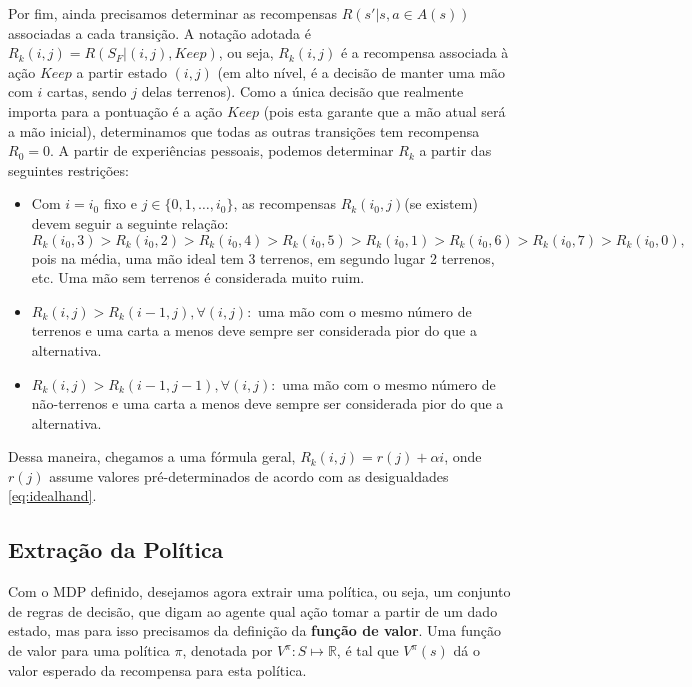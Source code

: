 Por fim, ainda precisamos determinar as recompensas $R\left(s' | s, a \in A(s) \right)$ associadas a cada
transição. A notação adotada é $R_k(i, j) = R(S_F | (i, j), Keep)$, ou seja, $R_k(i, j)$ é a recompensa
associada à ação $Keep$ a partir estado $(i, j)$ (em alto nível, é a decisão de manter uma mão com $i$
cartas, sendo $j$ delas terrenos). Como a única decisão que realmente importa para a pontuação é a ação
$Keep$ (pois esta garante que a mão atual será a mão inicial), determinamos que todas as outras transições
tem recompensa $R_0 = 0$. A partir de experiências pessoais, podemos determinar $R_k$ a partir das seguintes
restrições:
\begin{itemize}
  \item Com $i= i_0$ fixo e $j\in\{0,1,\ldots,i_0\}$, as recompensas $R_k(i_0, j)$(se existem) devem seguir a
  seguinte relação:
  \begin{equation} \label{eq:idealhand}R_k (i_0, 3) > R_k(i_0, 2) > R_k(i_0, 4)
> R_k(i_0, 5) > R_k(i_0, 1) > R_k(i_0, 6) > R_k(i_0, 7) > R_k(i_0,
0),\end{equation}
  pois na média, uma mão ideal tem 3 terrenos, em segundo lugar 2
terrenos, etc. Uma mão sem terrenos é considerada muito ruim.
  \item $R_k(i, j) > R_k(i - 1, j), \forall (i, j):$ uma mão com o mesmo
número de terrenos e uma carta a menos deve sempre ser considerada pior
do que a alternativa.
  \item $R_k(i, j) > R_k(i - 1, j - 1), \forall (i, j):$ uma mão com o mesmo
número de não-terrenos e uma carta a menos deve sempre ser considerada
pior do que a alternativa.
\end{itemize}



Dessa maneira, chegamos a uma fórmula geral, $R_k(i, j) = r(j) + \alpha
i$, onde $r(j)$ assume valores pré-determinados de acordo com
as desigualdades \ref{eq:idealhand}.

\subsection{Extração da Política}
Com o MDP definido, desejamos agora extrair uma política, ou seja, um conjunto de regras
de decisão, que digam ao agente qual ação tomar a partir de um dado estado, mas para isso
precisamos da definição da \textbf{função de valor}. Uma função de valor para uma política
$\pi$, denotada por $V^\pi: S \mapsto \mathbb{R}$, é tal que $V^\pi(s)$ dá o valor esperado
da recompensa para esta política.

